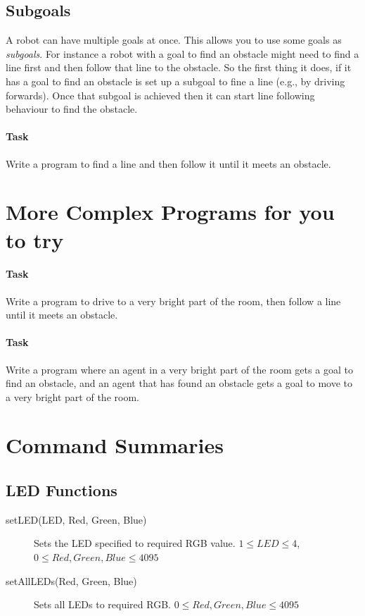 \documentclass[a4,12pt]{article}
\begin{document}
\subsection{Subgoals}

A robot can have multiple goals at once.  This allows you to use some goals as \emph{subgoals}.  For instance a robot with a goal to find an obstacle might need to find a line first and then follow that line to the obstacle.  So the first thing it does, if it has a goal to find an obstacle is set up a subgoal to fine a line (e.g., by driving forwards).  Once that subgoal is achieved then it can start line following behaviour to find the obstacle.

\paragraph{Task} Write a program to find a line and then follow it until it meets an obstacle.

\section{More Complex Programs for you to try}

\paragraph{Task}  Write a program to drive to a very bright part of the room, then follow a line until it meets an obstacle.

\paragraph{Task} Write a program where an agent in a very bright part of the room gets a goal to find an obstacle, and an agent that has found an obstacle gets a goal to move to a very bright part of the room.

\section{Command Summaries}

\subsection{LED Functions}

\begin{description}
\item[setLED(LED, Red, Green, Blue)] Sets the LED specified to required RGB value.  $1 \leq LED \leq 4$, $0 \leq Red, Green, Blue \leq 4095$
\item[setAllLEDs(Red, Green, Blue)] Sets all LEDs to required RGB.   $0 \leq Red, Green, Blue \leq 4095$
\end{description}
\end{document}
